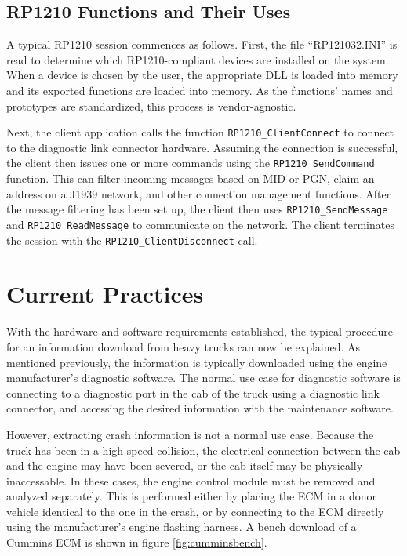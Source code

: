 \subsection{RP1210 Functions and Their Uses}

A typical RP1210 session commences as follows. First, the file ``RP121032.INI'' is read to determine which RP1210-compliant devices are installed
on the system. When a device is chosen by the user, the appropriate DLL is loaded into memory and its exported functions are loaded into memory.
As the functions' names and prototypes are standardized, this process is vendor-agnostic.

Next, the client application calls the function \texttt{RP1210\_ClientConnect} to connect to the diagnostic link connector hardware. Assuming
the connection is successful, the client then issues one or more commands using the \texttt{RP1210\_SendCommand} function. This can filter incoming
messages based on MID or PGN, claim an address on a J1939 network, and other connection management functions. After the message filtering has been
set up, the client then uses \texttt{RP1210\_SendMessage} and \texttt{RP1210\_ReadMessage} to communicate on the network. The client terminates
the session with the \texttt{RP1210\_ClientDisconnect} call.

\section{Current Practices}

With the hardware and software requirements established, the typical procedure for an information download from heavy trucks can now be explained.
As mentioned previously, the information is typically downloaded using the engine manufacturer's diagnostic software. The normal use case
for diagnostic software is connecting to a diagnostic port in the cab of the truck using a diagnostic link connector, and accessing the desired
information with the maintenance software.

However, extracting crash information is not a normal use case. Because the truck has been in a high speed collision, the electrical connection
between the cab and the engine may have been severed, or the cab itself may be physically inaccessable. In these cases, the engine control module
must be removed and analyzed separately. This is performed either by placing the ECM in a donor vehicle identical to the one in the crash, or
by connecting to the ECM directly using the manufacturer's engine flashing harness. A bench download of a Cummins ECM is shown in figure \ref{fig:cumminsbench}.


